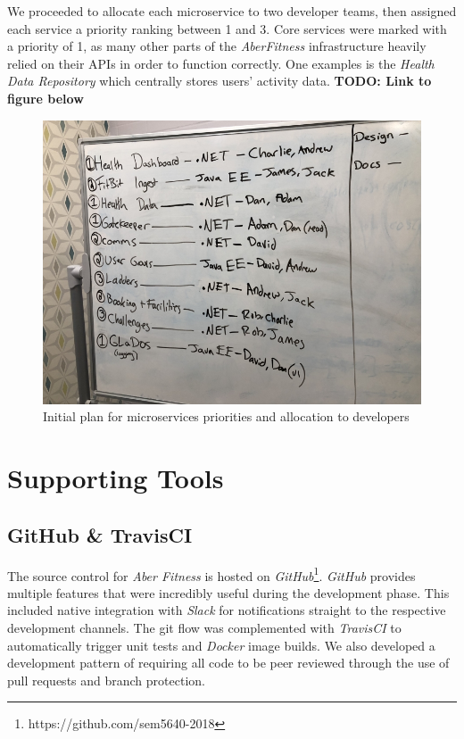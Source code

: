 \par
We proceeded to allocate each microservice to two developer teams, then assigned each service a priority ranking between 1 and 3. Core services were marked with a priority of 1, as many other parts of the \textit{AberFitness} infrastructure heavily relied on their APIs in order to function correctly. One examples is the \textit{Health Data Repository} which centrally stores users' activity data.  \textbf{TODO: Link to figure below}

\begin{figure}[H]
    \centering
    \includegraphics[width=\textwidth]{Images/Numbering_Microservices.jpg}
    \caption{Initial plan for microservices priorities and allocation to developers}
\end{figure}


\section{Supporting Tools}
\subsection{GitHub \& TravisCI}
The source control for \textit{Aber Fitness} is hosted on \textit{GitHub}\footnote{https://github.com/sem5640-2018}. \textit{GitHub} provides multiple features that were incredibly useful during the development phase. This included native integration with \textit{Slack} for notifications straight to the respective development channels. The git flow was complemented with \textit{TravisCI} to automatically trigger unit tests and \textit{Docker} image builds. We also developed a development pattern of requiring all code to be peer reviewed through the use of pull requests and branch protection.

